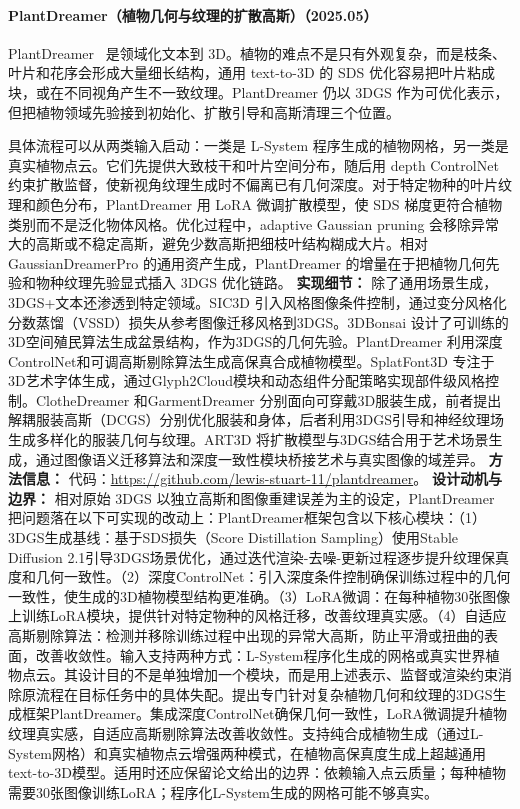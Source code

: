 \paragraph{PlantDreamer（植物几何与纹理的扩散高斯）（2025.05）}
PlantDreamer~\cite{2505_15528} 是领域化文本到 3D。植物的难点不是只有外观复杂，而是枝条、叶片和花序会形成大量细长结构，通用 text-to-3D 的 SDS 优化容易把叶片粘成块，或在不同视角产生不一致纹理。PlantDreamer 仍以 3DGS 作为可优化表示，但把植物领域先验接到初始化、扩散引导和高斯清理三个位置。

具体流程可以从两类输入启动：一类是 L-System 程序生成的植物网格，另一类是真实植物点云。它们先提供大致枝干和叶片空间分布，随后用 depth ControlNet 约束扩散监督，使新视角纹理生成时不偏离已有几何深度。对于特定物种的叶片纹理和颜色分布，PlantDreamer 用 LoRA 微调扩散模型，使 SDS 梯度更符合植物类别而不是泛化物体风格。优化过程中，adaptive Gaussian pruning 会移除异常大的高斯或不稳定高斯，避免少数高斯把细枝叶结构糊成大片。相对 GaussianDreamerPro 的通用资产生成，PlantDreamer 的增量在于把植物几何先验和物种纹理先验显式插入 3DGS 优化链路。
\textbf{实现细节：} 除了通用场景生成，3DGS+文本还渗透到特定领域。SIC3D 引入风格图像条件控制，通过变分风格化分数蒸馏（VSSD）损失从参考图像迁移风格到3DGS。3DBonsai 设计了可训练的3D空间殖民算法生成盆景结构，作为3DGS的几何先验。PlantDreamer 利用深度ControlNet和可调高斯剔除算法生成高保真合成植物模型。SplatFont3D 专注于3D艺术字体生成，通过Glyph2Cloud模块和动态组件分配策略实现部件级风格控制。ClotheDreamer 和GarmentDreamer 分别面向可穿戴3D服装生成，前者提出解耦服装高斯（DCGS）分别优化服装和身体，后者利用3DGS引导和神经纹理场生成多样化的服装几何与纹理。ART3D 将扩散模型与3DGS结合用于艺术场景生成，通过图像语义迁移算法和深度一致性模块桥接艺术与真实图像的域差异。
\textbf{方法信息：} 代码：\url{https://github.com/lewis-stuart-11/plantdreamer}。
\textbf{设计动机与边界：} 相对原始 3DGS 以独立高斯和图像重建误差为主的设定，PlantDreamer 把问题落在以下可实现的改动上：PlantDreamer框架包含以下核心模块：（1）3DGS生成基线：基于SDS损失（Score Distillation Sampling）使用Stable Diffusion 2.1引导3DGS场景优化，通过迭代渲染-去噪-更新过程逐步提升纹理保真度和几何一致性。（2）深度ControlNet：引入深度条件控制确保训练过程中的几何一致性，使生成的3D植物模型结构更准确。（3）LoRA微调：在每种植物30张图像上训练LoRA模块，提供针对特定物种的风格迁移，改善纹理真实感。（4）自适应高斯剔除算法：检测并移除训练过程中出现的异常大高斯，防止平滑或扭曲的表面，改善收敛性。输入支持两种方式：L-System程序化生成的网格或真实世界植物点云。其设计目的不是单独增加一个模块，而是用上述表示、监督或渲染约束消除原流程在目标任务中的具体失配。提出专门针对复杂植物几何和纹理的3DGS生成框架PlantDreamer。集成深度ControlNet确保几何一致性，LoRA微调提升植物纹理真实感，自适应高斯剔除算法改善收敛性。支持纯合成植物生成（通过L-System网格）和真实植物点云增强两种模式，在植物高保真度生成上超越通用text-to-3D模型。适用时还应保留论文给出的边界：依赖输入点云质量；每种植物需要30张图像训练LoRA；程序化L-System生成的网格可能不够真实。
